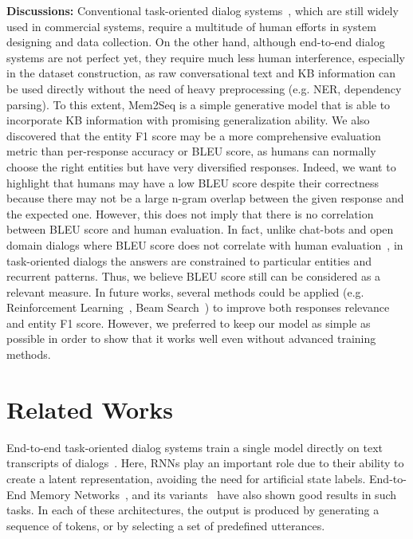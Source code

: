 \documentclass[11pt,a4paper]{article}
\begin{document}
\noindent\textbf{Discussions:} Conventional task-oriented dialog systems~\cite{williams2007partially}, which are still widely used in commercial systems, require a multitude of human efforts in system designing and data collection. On the other hand, although end-to-end dialog systems are not perfect yet, they require much less human interference, especially in the dataset construction, as raw conversational text and KB information can be used directly without the need of heavy preprocessing (e.g. NER, dependency parsing). To this extent, Mem2Seq is a simple generative model that is able to incorporate KB information with promising generalization ability. We also discovered that the entity F1 score may be a more comprehensive evaluation metric than per-response accuracy or BLEU score, as humans can normally choose the right entities but have very diversified responses. Indeed, we want to highlight that humans may have a low BLEU score despite their correctness because there may not be a large n-gram overlap between the given response and the expected one. However, this does not imply that there is no correlation between BLEU score and human evaluation. In fact, unlike chat-bots and open domain dialogs where BLEU score does not correlate with human evaluation~\cite{liu-EtAl:2016:EMNLP20163}, in task-oriented dialogs the answers are constrained to particular entities and recurrent patterns. Thus, we believe BLEU score still can be considered as a relevant measure. In future works, several methods could be applied (e.g. Reinforcement Learning~\cite{ranzato2015sequence}, Beam Search~\cite{wiseman-rush:2016:EMNLP2016}) to improve both responses relevance and entity F1 score. However, we preferred to keep our model as simple as possible in order to show that it works well even without advanced training methods.

\section{Related Works}
End-to-end task-oriented dialog systems train a single model directly on text transcripts of dialogs~\cite{wen2016network,serban2016building,williams2017hybrid,zhao2017generative, seo2016query,serban2017hierarchical}. Here, RNNs play an important role due to their ability to create a latent representation, avoiding the need for artificial state labels. End-to-End Memory Networks~\cite{bordes2016learning,sukhbaatar2015end}, and its variants~\cite{perez2016gated,wu2017dstc6,dqmem} have also shown good results in such tasks. In each of these architectures, the output is produced by generating a sequence of tokens, or by selecting a set of predefined utterances.
\end{document}

